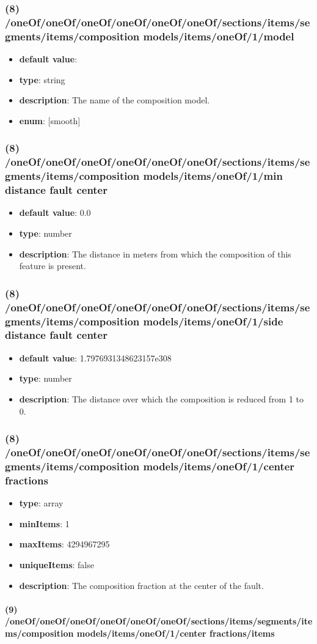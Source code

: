 \subsubsection{(8) /oneOf/oneOf/oneOf/oneOf/oneOf/oneOf/sections/items/segments/items/composition models/items/oneOf/1/model}
\begin{itemize}[leftmargin=8em]\item {\bf default value}: 
\item {\bf type}: string
\item {\bf description}: The name of the composition model.
\item {\bf enum}: [smooth]\end{itemize}\subsubsection{(8) /oneOf/oneOf/oneOf/oneOf/oneOf/oneOf/sections/items/segments/items/composition models/items/oneOf/1/min distance fault center}
\begin{itemize}[leftmargin=8em]\item {\bf default value}: 0.0
\item {\bf type}: number
\item {\bf description}: The distance in meters from which the composition of this feature is present.
\end{itemize}\subsubsection{(8) /oneOf/oneOf/oneOf/oneOf/oneOf/oneOf/sections/items/segments/items/composition models/items/oneOf/1/side distance fault center}
\begin{itemize}[leftmargin=8em]\item {\bf default value}: 1.7976931348623157e308
\item {\bf type}: number
\item {\bf description}: The distance over which the composition is reduced from 1 to 0.
\end{itemize}\subsubsection{(8) /oneOf/oneOf/oneOf/oneOf/oneOf/oneOf/sections/items/segments/items/composition models/items/oneOf/1/center fractions}
\begin{itemize}[leftmargin=8em]\item {\bf type}: array
\item {\bf minItems}: 1
\item {\bf maxItems}: 4294967295
\item {\bf uniqueItems}: false
\item {\bf description}: The composition fraction at the center of the fault.
\end{itemize}\paragraph{(9) /oneOf/oneOf/oneOf/oneOf/oneOf/oneOf/sections/items/segments/items/composition models/items/oneOf/1/center fractions/items}

